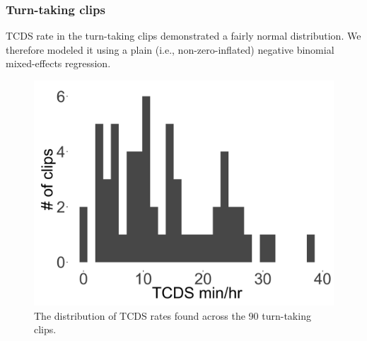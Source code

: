 \documentclass[floatsintext,man]{apa6}
\theoremstyle{definition}
\theoremstyle{definition}
\theoremstyle{definition}
\theoremstyle{remark}
\begin{document}
\FloatBarrier

\subsubsection{Turn-taking clips}\label{models-tcds-turntaking}

TCDS rate in the turn-taking clips demonstrated a fairly normal
distribution. We therefore modeled it using a plain (i.e.,
non-zero-inflated) negative binomial mixed-effects regression.

\FloatBarrier

\begin{figure}[H]

{\centering \includegraphics[width=0.4\linewidth]{www/TCDS_turntaking_distribution} 

}

\caption{The distribution of TCDS rates found across the 90 turn-taking clips.}\label{fig:fig4}
\end{figure}

\FloatBarrier
\end{document}
